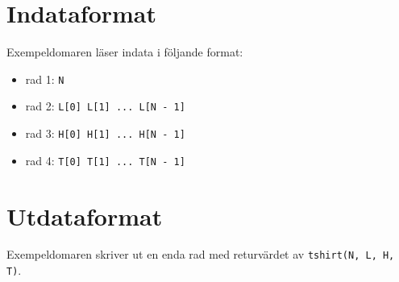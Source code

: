 \section*{Indataformat}
Exempeldomaren läser indata i följande format:

\begin{itemize}
  \item rad 1: \texttt{N}
  \item rad 2: \texttt{L[0] L[1] ... L[N - 1]}
  \item rad 3: \texttt{H[0] H[1] ... H[N - 1]}
  \item rad 4: \texttt{T[0] T[1] ... T[N - 1]}
\end{itemize}

\section*{Utdataformat}
Exempeldomaren skriver ut en enda rad med returvärdet av \texttt{tshirt(N, L, H, T)}.
